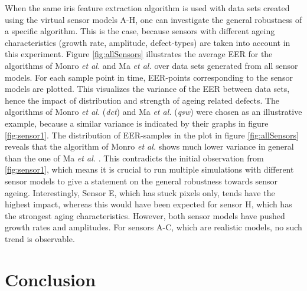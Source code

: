 \documentclass[10pt,twocolumn,letterpaper]{article}
\providecommand{\etal}[0]{\textit{et al.} }
\begin{document}
 When the same iris feature extraction algorithm is used with data sets created using the virtual sensor models A-H, one can investigate the general robustness of a specific algorithm. This is the case, because sensors with different ageing characteristics (growth rate, amplitude, defect-types) are taken into account in this experiment. Figure \ref{fig:allSensors} illustrates the average EER for the algorithms of Monro \etal and Ma \etal over data sets generated from all sensor models. For each sample point in time, EER-points corresponding to the sensor models are plotted. This visualizes the variance of the EER between data sets, hence the impact of distribution and strength of ageing related defects. The algorithms of Monro \etal (\emph{dct}) and Ma \etal (\emph{qsw}) were chosen as an illustrative example, because a similar variance is indicated by their graphs in figure \ref{fig:sensor1}. The distribution of EER-samples in the plot in figure \ref{fig:allSensors} reveals that the algorithm of Monro \etal shows much lower variance in general than the one of Ma \etal. This contradicts the initial observation from \ref{fig:sensor1}, which means it is crucial to run multiple simulations with different sensor models to give a statement on the general robustness towards sensor ageing. Interestingly, Sensor E, which has stuck pixels only, tends have the highest impact, whereas this would have been expected for sensor H, which has the strongest aging characteristics. However, both sensor models have pushed growth rates and amplitudes. For sensors A-C, which are realistic models, no such trend is observable.
 
 \section{Conclusion}
 \label{conclusion}
 
\end{document}

